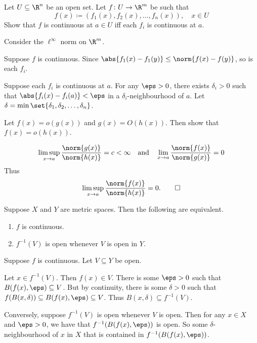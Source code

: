 \begin{exercise} \label{thm:cont:Rn}
    Let $U \subseteq \R^n$ be an open set.
    Let $f\colon U \to \R^m$ be such that \[
        f(x) \coloneq (f_1(x), f_2(x), \dots, f_n(x)), \quad x \in U
    \] Show that $f$ is continuous at $a \in U$ iff each $f_i$ is continuous
    at $a$.
\end{exercise}
\begin{solution}
    Consider the $\ell^\infty$ norm on $\R^m$.

    Suppose $f$ is continuous.
    Since $\abs{f_1(x) - f_1(y)} \le \norm{f(x) - f(y)}$, so is
    each $f_i$.

    Suppose each $f_i$ is continuous at $a$.
    For any $\eps > 0$, there exists $\delta_i > 0$ such that
    $\abs{f_i(x) - f_i(a)} < \eps$ in a
    $\delta_i$-neighbourhood of $a$.
    Let $\delta = \min\set{\delta_1, \delta_2, \dots, \delta_n}$.
\end{solution}

\begin{exercise} \label{thm:oO}
    Let $f(x) = o(g(x))$ and $g(x) = O(h(x))$.
    Then show that $f(x) = o(h(x))$.
\end{exercise}
\begin{solution}
    \[
        \limsup_{x \to a} \frac{\norm{g(x)}}{\norm{h(x)}} = c < \infty
        \quad \text{and} \quad
        \lim_{x \to a} \frac{\norm{f(x)}}{\norm{g(x)}} = 0
    \] Thus \[
        \limsup_{x \to a} \frac{\norm{f(x)}}{\norm{h(x)}} = 0. \qedhere
    \]
\end{solution}

\begin{proposition} \label{prp:cont-open}
    Suppose $X$ and $Y$ are metric spaces.
    Then the following are equivalent.
    \begin{enumerate}
        \item $f$ is continuous.
        \item $f^{-1}(V)$ is open whenever $V$ is open in $Y$.
    \end{enumerate}
\end{proposition}
\begin{solution}
    Suppose $f$ is continuous.
    Let $V \subseteq Y$ be open.

    Let $x \in f^{-1}(V)$.
    Then $f(x) \in V$.
    There is some $\eps > 0$ such that
    $B(f(x), \eps) \subseteq V$.
    But by continuity, there is some $\delta > 0$ such that
    $f(B(x, \delta)) \subseteq B(f(x), \eps) \subseteq V$.
    Thus $B(x, \delta) \subseteq f^{-1}(V)$.

    Conversely, suppose $f^{-1}(V)$ is open whenever $V$ is open.
    Then for any $x \in X$ and $\eps > 0$, we have
    that $f^{-1}(B(f(x), \eps))$ is open.
    So some $\delta$-neighbourhood of $x$ in $X$ that is contained
    in $f^{-1}(B(f(x), \eps))$.
\end{solution}
